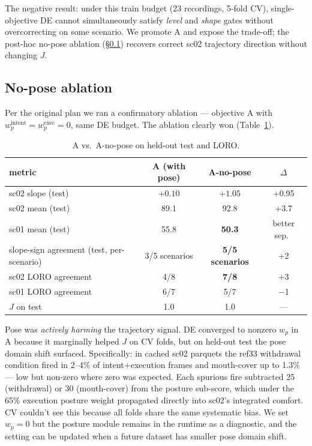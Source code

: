 \documentclass{article}
\begin{document}
The negative result: under this train budget (23 recordings, 5-fold CV), single-objective DE cannot simultaneously satisfy \emph{level} and \emph{shape} gates without overcorrecting on some scenario. We promote A and expose the trade-off; the post-hoc no-pose ablation (\S\ref{sec:nopose}) recovers correct sc02 trajectory direction without changing $J$.

\subsection{No-pose ablation}\label{sec:nopose}

Per the original plan we ran a confirmatory ablation --- objective A with $w_p^\text{intent} = w_p^\text{exec} = 0$, same DE budget. The ablation clearly won (Table~\ref{tab:nopose}).

\begin{table}[h]
\centering
\caption{A vs.\ A-no-pose on held-out test and LORO.}
\label{tab:nopose}
\small
\begin{tabular}{@{}lccc@{}}
\toprule
metric & A (with pose) & A-no-pose & $\Delta$ \\
\midrule
sc02 slope (test)              & $+0.10$ & \textbf{$+1.05$} & +0.95 \\
sc02 mean (test)               & 89.1 & 92.8 & +3.7 \\
sc01 mean (test)               & 55.8 & \textbf{50.3} & better sep.\ \\
slope-sign agreement (test, per-scenario) & 3/5 scenarios & \textbf{5/5 scenarios} & +2 \\
sc02 LORO agreement            & 4/8  & \textbf{7/8}  & +3 \\
sc01 LORO agreement            & 6/7  & 5/7  & $-$1 \\
$J$ on test                    & 1.0  & 1.0  & --- \\
\bottomrule
\end{tabular}
\end{table}

Pose was \emph{actively harming} the trajectory signal. DE converged to nonzero $w_p$ in A because it marginally helped $J$ on CV folds, but on held-out test the pose domain shift surfaced. Specifically: in cached sc02 parquets the ref33 withdrawal condition fired in 2--4\% of intent$+$execution frames and mouth-cover up to 1.3\% --- low but non-zero where zero was expected. Each spurious fire subtracted 25 (withdrawal) or 30 (mouth-cover) from the posture sub-score, which under the 65\% execution posture weight propagated directly into sc02's integrated comfort. CV couldn't see this because all folds share the same systematic bias. We set $w_p = 0$ but the posture module remains in the runtime as a diagnostic, and the setting can be updated when a future dataset has smaller pose domain shift.
\end{document}
